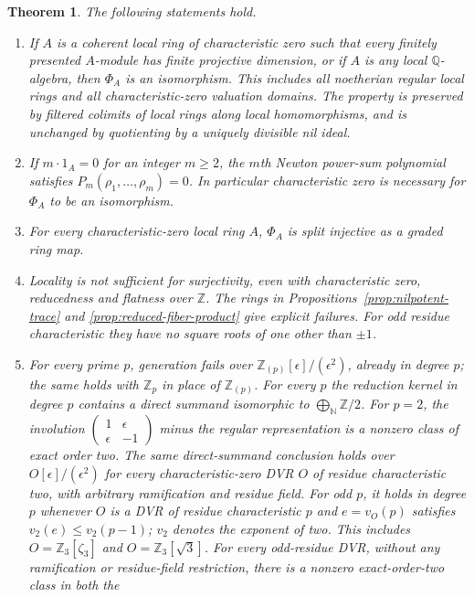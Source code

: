 \documentclass[11pt,a4paper]{article}
\newtheorem{theorem}{Theorem}[section]
\theoremstyle{definition}\newtheorem{definition}[theorem]{Definition}
\theoremstyle{remark}\newtheorem{remark}[theorem]{Remark}
\newcommand{\Z}{\mathbb Z}\newcommand{\Q}{\mathbb Q}
\begin{document}
\begin{theorem}\label{thm:answers}
The following statements hold.
\begin{enumerate}[label=\textup{(\roman*)}]
\item If $A$ is a coherent local ring of characteristic zero such that
every finitely presented $A$-module has finite projective dimension,
or if $A$ is any local $\Q$-algebra, then $\Phi_A$ is an isomorphism.
This includes all noetherian regular local rings and all
characteristic-zero valuation domains.  The property is preserved
by filtered colimits of local rings along local homomorphisms,
and is unchanged by quotienting by a uniquely divisible nil ideal.
\item If $m\cdot1_A=0$ for an integer $m\geq2$, the $m$th Newton
power-sum polynomial satisfies $P_m(\rho_1,\ldots,\rho_m)=0$.
In particular characteristic zero is necessary for $\Phi_A$ to be
an isomorphism.
\item For every characteristic-zero local ring $A$, $\Phi_A$ is
split injective as a graded ring map.
\item Locality is not sufficient for surjectivity, even with
characteristic zero, reducedness and flatness over $\Z$.  The rings
in Propositions~\ref{prop:nilpotent-trace} and
\ref{prop:reduced-fiber-product} give explicit failures.  For odd
residue characteristic they have no square roots of one other than
$\pm1$.
\item For every prime $p$, generation fails over
$\Z_{(p)}[\epsilon]/(\epsilon^2)$, already in degree $p$; the same
holds with $\Z_p$ in place of $\Z_{(p)}$.
For every $p$ the reduction kernel in degree $p$ contains a direct
summand isomorphic to $\bigoplus_{\mathbb N}\Z/2$.
For $p=2$, the involution
$\left(\begin{smallmatrix}1&\epsilon\\\epsilon&-1\end{smallmatrix}\right)$
minus the regular representation is a nonzero class of exact order two.
The same direct-summand conclusion holds over
$O[\epsilon]/(\epsilon^2)$ for every characteristic-zero DVR $O$
of residue characteristic two, with arbitrary ramification and residue
field.  For odd $p$, it holds in degree $p$ whenever $O$ is a
DVR of residue characteristic $p$ and
$e=v_O(p)$ satisfies $v_2(e)\le v_2(p-1)$; $v_2$ denotes the
exponent of two.  This includes $O=\Z_3[\zeta_3]$ and
$O=\Z_3[\sqrt3]$.
For every odd-residue DVR, without any ramification or residue-field
restriction, there is a nonzero exact-order-two class in both the

\end{enumerate}
\end{theorem}
\end{document}
